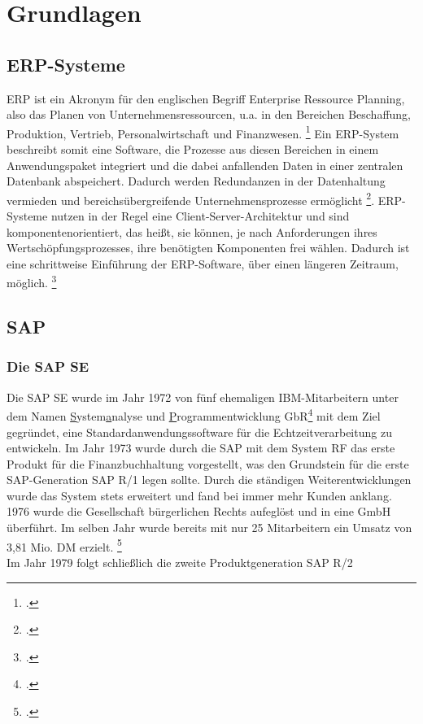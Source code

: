 \section{Grundlagen}
\subsection{ERP-Systeme}
ERP ist ein Akronym für den englischen Begriff \glqq{}Enterprise Ressource Planning\grqq{}, also das Planen von Unternehmensressourcen, u.a. in den Bereichen Beschaffung, Produktion, Vertrieb, Personalwirtschaft und Finanzwesen. \footcite[Vgl.][523]{wibuch} Ein ERP-System beschreibt somit eine Software, die Prozesse aus diesen Bereichen in einem Anwendungspaket integriert und die dabei anfallenden Daten in einer zentralen Datenbank abspeichert. Dadurch werden Redundanzen in der Datenhaltung vermieden und bereichsübergreifende Unternehmensprozesse ermöglicht \footcite[Vgl.][523]{wibuch}. ERP-Systeme nutzen in der Regel eine Client-Server-Architektur und sind komponentenorientiert, das heißt, sie können, je nach Anforderungen ihres Wertschöpfungsprozesses, ihre benötigten Komponenten frei wählen. Dadurch ist eine schrittweise Einführung der ERP-Software, über einen längeren Zeitraum, möglich. \footcite[Vgl.][524 f.]{wibuch}

\subsection{SAP}
\subsubsection{Die SAP SE}
Die SAP SE wurde im Jahr 1972 von fünf ehemaligen IBM-Mitarbeitern unter dem Namen \glqq{}\underline{S}ystem\underline{a}nalyse und \underline{P}rogrammentwicklung GbR\grqq{}\footcite[Vgl.][]{think-ing}  mit dem Ziel gegründet, eine Standardanwendungssoftware für die Echtzeitverarbeitung zu entwickeln.  Im Jahr 1973 wurde durch die SAP mit dem \glqq{}System RF\grqq{} das erste Produkt für die Finanzbuchhaltung vorgestellt, was den Grundstein für die erste SAP-Generation \glqq{}SAP R/1\grqq{} legen sollte. Durch die ständigen Weiterentwicklungen wurde das System stets erweitert und fand bei immer mehr Kunden anklang. 1976 wurde die Gesellschaft bürgerlichen Rechts aufeglöst und in eine GmbH überführt. Im selben Jahr wurde bereits mit nur 25 Mitarbeitern ein Umsatz von 3,81 Mio. DM erzielt. \footcite[Vgl.][]{sap-fruehejahre}\\Im Jahr 1979 folgt schließlich die zweite Produktgeneration \glqq{}SAP R/2\grqq{}

